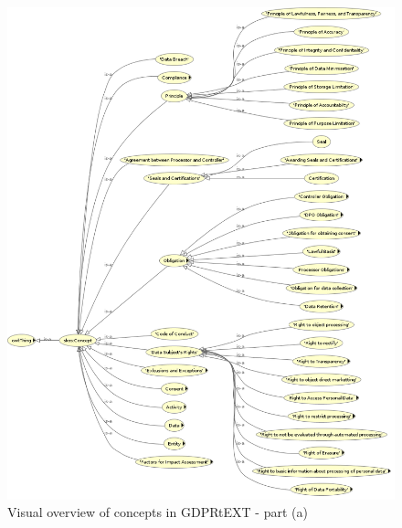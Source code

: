 \begin{figure}[htbp]
    \centering
    \includegraphics[width=\linewidth]{img/gdprtext-summary-a}
    \caption{Visual overview of concepts in GDPRtEXT - part (a) \cite{pandit_gdprtext_2018}}
    \label{fig:vocab:gdprtext-summary-a}
\end{figure}
